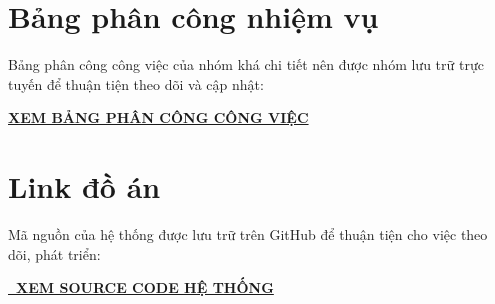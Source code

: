 \documentclass[12pt,a4paper]{article}
\begin{document}
\newpage
\section*{Bảng phân công nhiệm vụ}
Bảng phân công công việc của nhóm khá chi tiết nên được nhóm lưu trữ trực tuyến để thuận tiện theo dõi và cập nhật:

\begin{center}
\textbf{\Large
\href{https://docs.google.com/spreadsheets/d/1orHbU9IxSBTTOqu8nbCmwukOrbziY6j6/edit?gid=91630022\#gid=91630022}
{XEM BẢNG PHÂN CÔNG CÔNG VIỆC}
}
\end{center}

\hypersetup{
    colorlinks=true,
    urlcolor=blue
}

\section*{Link đồ án}
Mã nguồn của hệ thống được lưu trữ trên GitHub để thuận tiện cho việc theo dõi, phát triển:

\begin{center}
\textbf{\Large
\href{https://github.com/hoanganh-kevz/StudentManagement}
{\faGithub\ XEM SOURCE CODE HỆ THỐNG}
}
\end{center}
\end{document}
